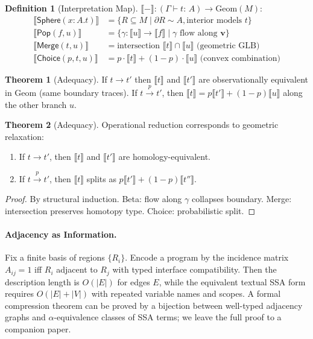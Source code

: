 \documentclass[12pt]{article}
\newcommand{\Entails}{\vdash}
\newcommand{\Types}{:\,}
\newcommand{\Sphere}{\mathsf{Sphere}}
\newcommand{\Pop}{\mathsf{Pop}}
\newcommand{\Merge}{\mathsf{Merge}}
\newcommand{\Choice}{\mathsf{Choice}}
\newcommand{\Ctx}{\Gamma}
\newcommand{\Interp}[1]{\llbracket #1 \rrbracket}
\newcommand{\step}{\rightarrow}
\newcommand{\pstep}[1]{\xrightarrow{#1}}
\newcommand{\Flow}{\mathbf{v}}
\theoremstyle{definition}
\newtheorem{definition}{Definition}
\newtheorem{theorem}{Theorem}
\begin{document}
\begin{definition}[Interpretation Map]
$\Interp{-} : (\Ctx \Entails t \Types A) \to \text{Geom}(M)$:
\begin{align*}
\Interp{\Sphere(x:A.t)} &= \{R \subseteq M \mid \partial R \sim A, \text{interior models } t\} \\
\Interp{\Pop(f,u)} &= \{\gamma : \Interp{u} \to \Interp{f} \mid \gamma \text{ flow along } \Flow\} \\
\Interp{\Merge(t,u)} &= \text{intersection } \Interp{t} \cap \Interp{u} \text{ (geometric GLB)} \\
\Interp{\Choice(p,t,u)} &= p \cdot \Interp{t} + (1-p) \cdot \Interp{u} \text{ (convex combination)}
\end{align*}
\end{definition}

\begin{theorem}[Adequacy]
If $t \step t'$ then $\Interp{t}$ and $\Interp{t'}$ are observationally equivalent in $\text{Geom}$ (same boundary traces). If $t \pstep{p} t'$, then $\Interp{t} = p\Interp{t'} + (1-p)\Interp{u}$ along the other branch $u$.
\end{theorem}

\begin{theorem}[Adequacy]
Operational reduction corresponds to geometric relaxation:
\begin{enumerate}
\item If $t \step t'$, then $\Interp{t}$ and $\Interp{t'}$ are homology-equivalent.
\item If $t \pstep{p} t'$, then $\Interp{t}$ splits as $p \Interp{t'} + (1-p) \Interp{t''}$.
\end{enumerate}
\end{theorem}
\begin{proof}
By structural induction. Beta: flow along $\gamma$ collapses boundary.
Merge: intersection preserves homotopy type. Choice: probabilistic split.
\end{proof}

\paragraph{Adjacency as Information.}
Fix a finite basis of regions $\{R_i\}$. Encode a program by the incidence matrix $A_{ij}=1$ iff $R_i$ adjacent to $R_j$ with typed interface compatibility. Then the description length is $O(|E|)$ for edges $E$, while the equivalent textual SSA form requires $O(|E| + |V|)$ with repeated variable names and scopes. A formal compression theorem can be proved by a bijection between well-typed adjacency graphs and $\alpha$-equivalence classes of SSA terms; we leave the full proof to a companion paper.
\end{document}
